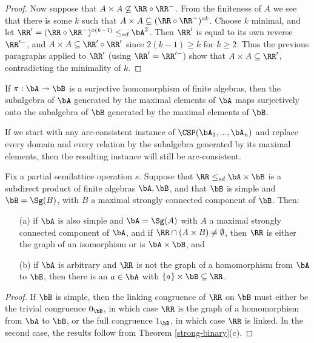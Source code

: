 \begin{proof}
Now suppose that $A \times A \not\subseteq \RR\circ \RR^-$. From the finiteness of $A$ we see that there is some $k$ such that $A \times A \subseteq (\RR\circ \RR^-)^{\circ k}$. Choose $k$ minimal, and let $\RR' = (\RR \circ \RR^-)^{\circ (k-1)} \le_{sd} \bA^2$. Then $\RR'$ is equal to its own reverse $\RR'^-$, and $A \times A \subseteq \RR' \circ \RR'$ since $2(k-1) \ge k$ for $k \ge 2$. Thus the previous paragraphs applied to $\RR'$ (using $\RR' = \RR'^-$) show that $A \times A \subseteq \RR'$, contradicting the minimality of $k$.
\end{proof}


\begin{cor}\label{maximal-projection} If $\pi : \bA \twoheadrightarrow \bB$ is a surjective homomorphism of finite algebras, then the subalgebra of $\bA$ generated by the maximal elements of $\bA$ maps surjectively onto the subalgebra of $\bB$ generated by the maximal elements of $\bB$.
\end{cor}

\begin{cor} If we start with any arc-consistent instance of $\CSP(\bA_1, ..., \bA_n)$ and replace every domain and every relation by the subalgebra generated by its maximal elements, then the resulting instance will still be arc-consistent.
\end{cor}

\begin{cor}\label{strong-simple} Fix a partial semilattice operation $s$. Suppose that $\RR \le_{sd} \bA\times \bB$ is a subdirect product of finite algebras $\bA, \bB$, and that $\bB$ is simple and $\bB = \Sg(B)$, with $B$ a maximal strongly connected component of $\bB$. Then:
\begin{itemize}
\item[(a)] if $\bA$ is also simple and $\bA = \Sg(A)$ with $A$ a maximal strongly connected component of $\bA$, and if $\RR \cap (A\times B) \ne \emptyset$, then $\RR$ is either the graph of an isomorphism or is $\bA\times \bB$, and

\item[(b)] if $\bA$ is arbitrary and $\RR$ is not the graph of a homomorphism from $\bA$ to $\bB$, then there is an $a \in \bA$ with $\{a\}\times \bB \subseteq \RR$.
\end{itemize}
\end{cor}
\begin{proof} If $\bB$ is simple, then the linking congruence of $\RR$ on $\bB$ must either be the trivial congruence $0_\bB$, in which case $\RR$ is the graph of a homomorphism from $\bA$ to $\bB$, or the full congruence $1_\bB$, in which case $\RR$ is linked. In the second case, the results follow from Theorem \ref{strong-binary}(c).
\end{proof}

